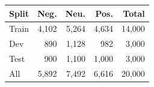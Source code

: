 \begin{tabular}{lrrrr}
\toprule
Split & Neg. & Neu. & Pos. & Total\\
\midrule
Train & 4,102 & 5,264 & 4,634 & 14,000\\
Dev & 890 & 1,128 & 982 & 3,000\\
Test & 900 & 1,100 & 1,000 & 3,000\\
\midrule
All & 5,892 & 7,492 & 6,616 & 20,000\\
\bottomrule
\end{tabular}
